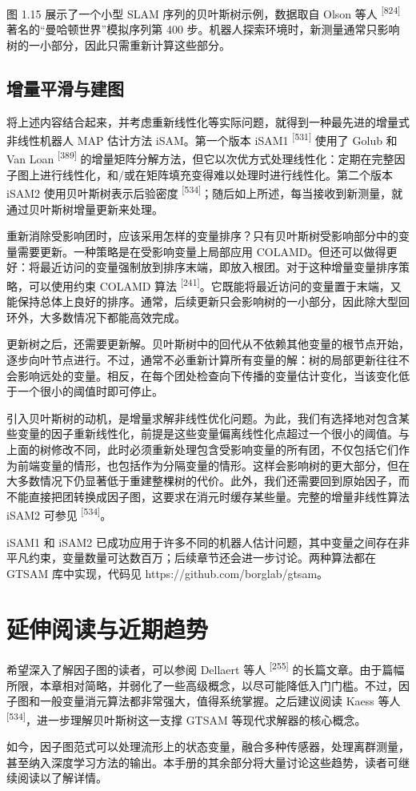 图 1.15 展示了一个小型 SLAM 序列的贝叶斯树示例，数据取自 Olson 等人 \textsuperscript{[824]} 著名的“曼哈顿世界”模拟序列第 400 步。机器人探索环境时，新测量通常只影响树的一小部分，因此只需重新计算这些部分。

\subsection{增量平滑与建图}

将上述内容结合起来，并考虑重新线性化等实际问题，就得到一种最先进的增量式非线性机器人 MAP 估计方法 iSAM。第一个版本 iSAM1 \textsuperscript{[531]} 使用了 Golub 和 Van Loan \textsuperscript{[389]} 的增量矩阵分解方法，但它以次优方式处理线性化：定期在完整因子图上进行线性化，和/或在矩阵填充变得难以处理时进行线性化。第二个版本 iSAM2 使用贝叶斯树表示后验密度 \textsuperscript{[534]}；随后如上所述，每当接收到新测量，就通过贝叶斯树增量更新来处理。

重新消除受影响团时，应该采用怎样的变量排序？只有贝叶斯树受影响部分中的变量需要更新。一种策略是在受影响变量上局部应用 COLAMD。但还可以做得更好：将最近访问的变量强制放到排序末端，即放入根团。对于这种增量变量排序策略，可以使用约束 COLAMD 算法 \textsuperscript{[241]}。它既能将最近访问的变量置于末端，又能保持总体上良好的排序。通常，后续更新只会影响树的一小部分，因此除大型回环外，大多数情况下都能高效完成。

更新树之后，还需要更新解。贝叶斯树中的回代从不依赖其他变量的根节点开始，逐步向叶节点进行。不过，通常不必重新计算所有变量的解：树的局部更新往往不会影响远处的变量。相反，在每个团处检查向下传播的变量估计变化，当该变化低于一个很小的阈值时即可停止。

引入贝叶斯树的动机，是增量求解非线性优化问题。为此，我们有选择地对包含某些变量的因子重新线性化，前提是这些变量偏离线性化点超过一个很小的阈值。与上面的树修改不同，此时必须重新处理包含受影响变量的所有团，不仅包括它们作为前端变量的情形，也包括作为分隔变量的情形。这样会影响树的更大部分，但在大多数情况下仍显著低于重建整棵树的代价。此外，我们还需要回到原始因子，而不能直接把团转换成因子图，这要求在消元时缓存某些量。完整的增量非线性算法 iSAM2 可参见 \textsuperscript{[534]}。

iSAM1 和 iSAM2 已成功应用于许多不同的机器人估计问题，其中变量之间存在非平凡约束，变量数量可达数百万；后续章节还会进一步讨论。两种算法都在 GTSAM 库中实现，代码见 https://github.com/borglab/gtsam。

\section{延伸阅读与近期趋势}

希望深入了解因子图的读者，可以参阅 Dellaert 等人 \textsuperscript{[255]} 的长篇文章。由于篇幅所限，本章相对简略，并弱化了一些高级概念，以尽可能降低入门门槛。不过，因子图和一般变量消元算法都非常强大，值得系统掌握。之后建议阅读 Kaess 等人 \textsuperscript{[534]}，进一步理解贝叶斯树这一支撑 GTSAM 等现代求解器的核心概念。

如今，因子图范式可以处理流形上的状态变量，融合多种传感器，处理离群测量，甚至纳入深度学习方法的输出。本手册的其余部分将大量讨论这些趋势，读者可继续阅读以了解详情。

